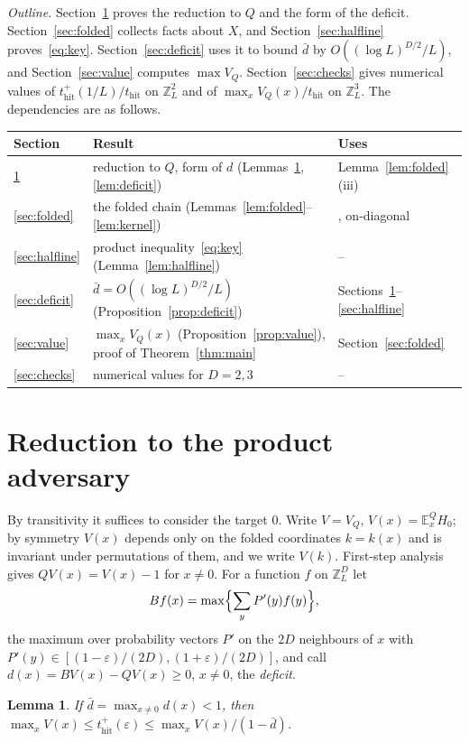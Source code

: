 \documentclass[11pt]{amsart}
\newtheorem{lemma}[theorem]{Lemma}
\theoremstyle{remark}
\newcommand{\eps}{\varepsilon}
\newcommand{\E}{\mathbb{E}}
\newcommand{\Z}{\mathbb{Z}}
\newcommand{\thit}{t_{\mathrm{hit}}}
\begin{document}
\emph{Outline.} Section~\ref{sec:reduction} proves the reduction to $Q$ and the form of the deficit. Section~\ref{sec:folded} collects facts about $X$, and Section~\ref{sec:halfline} proves~\eqref{eq:key}. Section~\ref{sec:deficit} uses it to bound $\bar d$ by $O((\log L)^{D/2}/L)$, and
Section~\ref{sec:value} computes
$\max V_Q$. Section~\ref{sec:checks} gives numerical values of $\thit^+(1/L)/\thit$ on $\Z_L^2$ and of $\max_xV_Q(x)/\thit$ on $\Z_L^3$. The dependencies are as follows.
\begin{center}
\begin{tabular}{lll}
\toprule
Section & Result & Uses\\ \midrule
\ref{sec:reduction} & reduction to $Q$, form of $d$ (Lemmas~\ref{lem:reduction}, \ref{lem:deficit}) & Lemma~\ref{lem:folded}(iii)\\
\ref{sec:folded} & the folded chain (Lemmas~\ref{lem:folded}--\ref{lem:kernel}) & \cite{Del99}, on-diagonal\\
\ref{sec:halfline} & product inequality~\eqref{eq:key} (Lemma~\ref{lem:halfline}) & --\\
\ref{sec:deficit} & $\bar d=O((\log L)^{D/2}/L)$ (Proposition~\ref{prop:deficit}) & Sections~\ref{sec:reduction}--\ref{sec:halfline}\\
\ref{sec:value} & $\max_xV_Q(x)$ (Proposition~\ref{prop:value}), proof of Theorem~\ref{thm:main} & Section~\ref{sec:folded}\\
\ref{sec:checks} & numerical values for $D=2,3$ & --\\
\bottomrule
\end{tabular}
\end{center}

\section{Reduction to the product adversary}\label{sec:reduction}

By transitivity it suffices to consider the target $0$. Write $V=V_Q$, $V(x)=\E^Q_xH_0$; by symmetry $V(x)$ depends
only on the folded coordinates $k=k(x)$ and is invariant under permutations of them, and we write $V(k)$. First-step
analysis gives $QV(x)=V(x)-1$ for $x\ne0$. For a function $f$ on $\Z_L^D$ let
\[
B f(x)=\max\Bigl\{\sum_yP'(y)f(y)\Bigr\},
\]
the maximum over probability vectors $P'$ on the $2D$ neighbours of $x$ with $P'(y)\in[(1-\eps)/(2D),(1+\eps)/(2D)]$,
and call $d(x)=BV(x)-QV(x)\ge0$, $x\ne0$, the \emph{deficit}.

\begin{lemma}\label{lem:reduction}
If $\bar d=\max_{x\ne0}d(x)<1$, then $\max_xV(x)\le\thit^+(\eps)\le\max_xV(x)/(1-\bar d)$.
\end{lemma}
\end{document}
